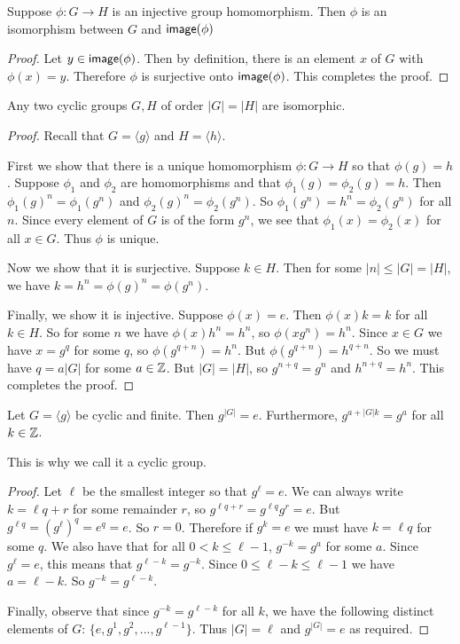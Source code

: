 \begin{lemma}
    Suppose $\phi : G \to H$ is an injective group homomorphism. Then $\phi$ is an isomorphism between $G$ and $\operatorname{\textsf{image}}(\phi)$
\end{lemma}
\begin{proof}
    Let $y \in \operatorname{\textsf{image}}(\phi)$. Then by definition, there is an element $x$ of $G$ with $\phi(x)=y$. Therefore $\phi$ is surjective onto $\operatorname{\textsf{image}}(\phi)$. This completes the proof.
\end{proof}
\begin{lemma}
    Any two cyclic groups $G,H$ of order $|G|=|H|$ are isomorphic.
\end{lemma}
\begin{proof}
    Recall that $G = \langle g\rangle$ and $H = \langle h \rangle$.
    
    First we show that there is a unique homomorphism $\phi: G\to H$ so that $\phi(g) = h$. Suppose $\phi_1$ and $\phi_2$ are homomorphisms and that $\phi_1(g)=\phi_2(g)=h$. Then $\phi_1(g)^n = \phi_1(g^n)$ and $\phi_2(g)^n = \phi_2(g^n)$. So $\phi_1(g^n) = h^n=\phi_2(g^n)$ for all $n$. Since every element of $G$ is of the form $g^n$, we see that $\phi_1(x)=\phi_2(x)$ for all $x\in G$. Thus $\phi$ is unique.

    Now we show that it is surjective. Suppose $k \in H$. Then for some $|n|\leq |G|=|H|$, we have $k = h^n = \phi(g)^n = \phi(g^n)$.

    Finally, we show it is injective. Suppose $\phi(x) = e$. Then $\phi(x)k=k$ for all $k\in H$. So for some $n$ we have $\phi(x)h^n = h^n$, so $\phi(xg^n) = h^n$. Since $x \in G$ we have $x = g^q$ for some $q$, so $\phi(g^{q+n}) = h^n$. But $\phi(g^{q+n}) = h^{q+n}$. So we must have $q = a|G|$ for some $a \in \operatorname{\mathbb{Z}}$. But $|G| = |H|$, so $g^{n+q} = g^n$ and $h^{n+q} = h^n$. This completes the proof.
\end{proof}
\begin{lemma}
    Let $G=\langle g\rangle$ be cyclic and finite. Then $g^{|G|} = e$. Furthermore, $g^{a+|G|k} = g^a$ for all $k\in\operatorname{\mathbb{Z}}$.
\end{lemma}
\begin{remark*}
    This is why we call it a cyclic group.
\end{remark*}
\begin{proof}
Let $\ell$ be the smallest integer so that $g^\ell = e$. We can always write $k = \ell q+r$ for some remainder $r$, so $g^{\ell q+r} = g^{\ell q}g^r = e$. But $g^{\ell q} = (g^\ell)^q = e^q = e$. So $r=0$. Therefore if $g^k = e$ we must have $k = \ell q$ for some $q$.
We also have that for all $0< k\leq \ell-1$, $g^{-k} = g^a$ for some $a$. Since $g^\ell = e$, this means that $g^{\ell-k} = g^{-k}$. Since $0\leq \ell-k\leq \ell-1$ we have $a=\ell-k$. So $g^{-k} = g^{\ell-k}$.

Finally, observe that since $g^{-k} = g^{\ell - k}$ for all $k$, we have the following distinct elements of $G$: $\{e, g^1,g^2,...,g^{\ell-1}\}$. Thus $|G| = \ell$ and $g^{|G|} = e$ as required.
\end{proof}


